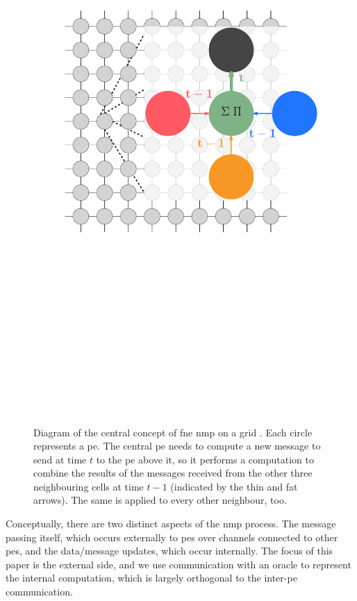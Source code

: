 \begin{figure}
    \centering
    \includegraphics[keepaspectratio,width=1.0\linewidth]{chapters/nmp/images/bp_diagram_recoloured.pdf}
    \caption{Diagram of the central concept of \gls{fne} \gls{nmp} on a grid \cite{lbpmpsmpic}.  Each circle represents a \gls{pe}.  The central \gls{pe} needs to compute a new message to send at time \(t\) to the \gls{pe} above it, so it performs a computation to combine the results of the messages received from the other three neighbouring cells at time \(t - 1\) (indicated by the thin and fat arrows).  The same is applied to every other neighbour, too.}
    \label{fig:nmp:gridmessaging}
\end{figure}

Conceptually, there are two distinct aspects of the \gls{nmp} process.  The message passing itself, which occurs externally to \glspl{pe} over channels connected to other \glspl{pe}, and the data/message updates, which occur internally.  The focus of this paper is the external side, and we use communication with an oracle to represent the internal computation, which is largely orthogonal to the inter-\gls{pe} communication.

